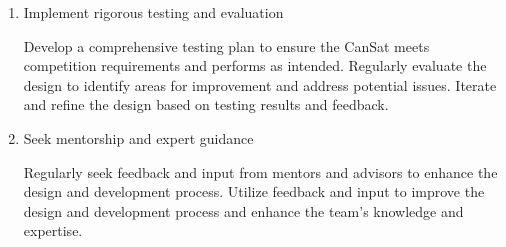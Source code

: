 \begin{enumerate}[topsep=3pt]
    \item Implement rigorous testing and evaluation
        \begin{itemize}[leftmargin=0.25cm,itemindent=0.5cm, noitemsep, topsep=1pt, label=\textbullet]
            \myitemtwo Develop a comprehensive testing plan to ensure the CanSat meets competition requirements and performs as intended.
            \myitemtwo Regularly evaluate the design to identify areas for improvement and address potential issues.
            \myitemtwo Iterate and refine the design based on testing results and feedback.
        \end{itemize}
    \item Seek mentorship and expert guidance
        \begin{itemize}[leftmargin=0.25cm,itemindent=0.5cm, noitemsep, topsep=1pt, label=\textbullet]
            \myitemtwo Regularly seek feedback and input from mentors and advisors to enhance the design and development process.
            \myitemtwo Utilize feedback and input to improve the design and development process and enhance the team's knowledge and expertise.
        \end{itemize}
\end{enumerate}
